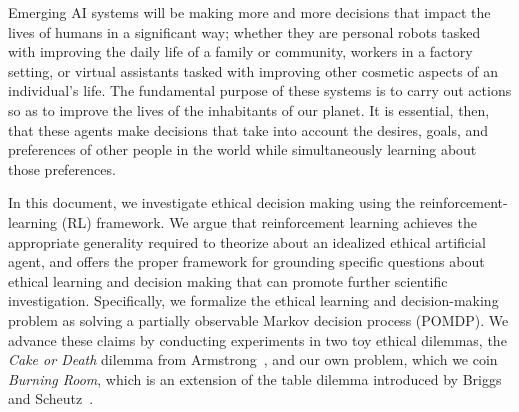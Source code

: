 \documentclass[11pt]{article}
\begin{document}
Emerging AI systems will be making more and more decisions that impact the lives of humans in a significant way; whether they are personal robots tasked with improving the daily life of a family or community,  workers in a factory setting, or virtual assistants tasked with improving other cosmetic aspects of an individual's life. The fundamental purpose of these systems is to carry out actions so as to improve the lives of the inhabitants of our planet. It is essential, then, that these agents make decisions that take into account the desires, goals, and preferences of other people in the world while simultaneously learning about those preferences. 

In this document, we investigate ethical decision making using the reinforcement-learning (RL) framework. We argue that reinforcement learning achieves the appropriate generality required to theorize about an idealized ethical artificial agent, and offers the proper framework for grounding specific questions about ethical learning and decision making that can promote further scientific investigation. Specifically, we formalize the ethical learning and decision-making problem as solving a partially observable Markov decision process (POMDP). We advance these claims by conducting experiments in two toy ethical dilemmas, the {\it Cake or Death} dilemma from Armstrong~, and our own problem, which we coin {\it Burning Room}, which is an extension of the table dilemma introduced by Briggs and Scheutz~.

\end{document}
